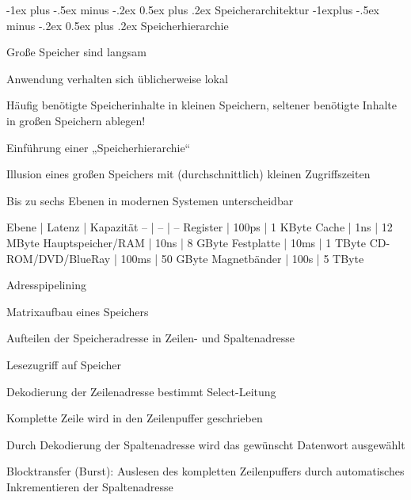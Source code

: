 \documentclass[10pt,landscape]{article}
\makeatletter
\renewcommand{\section}{\@startsection{section}{1}{0mm}%
                                {-1ex plus -.5ex minus -.2ex}%
                                {0.5ex plus .2ex}%
                                {\normalfont\large\bfseries}}
\renewcommand{\subsection}{\@startsection{subsection}{2}{0mm}%
                                {-1explus -.5ex minus -.2ex}%
                                {0.5ex plus .2ex}%
                                {\normalfont\normalsize\bfseries}}
\makeatother
\begin{document}
\begin{multicols}{3}
  \section{ Speicherarchitektur}
  \subsection{ Speicherhierarchie}
  \begin{itemize*}
    \item Große Speicher sind langsam
    \item Anwendung verhalten sich üblicherweise lokal
    \item Häufig benötigte Speicherinhalte in kleinen Speichern, seltener benötigte Inhalte in großen Speichern ablegen!
    \item Einführung einer „Speicherhierarchie“
    \item Illusion eines großen Speichers mit (durchschnittlich) kleinen Zugriffszeiten
    \item Bis zu sechs Ebenen in modernen Systemen unterscheidbar
  \end{itemize*}
  
  Ebene | Latenz | Kapazität 
  -- | -- | --
  Register | 100ps | 1 KByte
  Cache | 1ns | 12 MByte
  Hauptspeicher/RAM | 10ns | 8 GByte
  Festplatte | 10ms | 1 TByte
  CD-ROM/DVD/BlueRay | 100ms | 50 GByte
  Magnetbänder | 100s | 5 TByte
  
  \begin{itemize*}
    \item Adresspipelining
    \item Matrixaufbau eines Speichers
    \item Aufteilen der Speicheradresse in Zeilen- und Spaltenadresse
    \item Lesezugriff auf Speicher
    \item Dekodierung der Zeilenadresse bestimmt Select-Leitung
    \item Komplette Zeile wird in den Zeilenpuffer geschrieben
    \item Durch Dekodierung der Spaltenadresse wird das gewünscht Datenwort ausgewählt
    \item Blocktransfer (Burst): Auslesen des kompletten Zeilenpuffers durch automatisches Inkrementieren der Spaltenadresse
  \end{itemize*}
  

\end{multicols}
\end{document}
